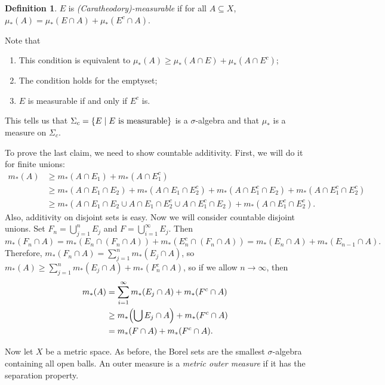 \documentclass[leqno, openany]{memoir}
\theoremstyle{definition}
\newtheorem{defn}[thm]{Definition}
\theoremstyle{remark}
\theoremstyle{plain}
\theoremstyle{definition}
\theoremstyle{remark}
\begin{document}
\begin{defn}
    $E$ is \textit{(Caratheodory)-measurable} if for all $A \subseteq X$, $\mu_*(A) = \mu_*(E \cap A) + \mu_*(E^c \cap A)$.
\end{defn}

Note that
\begin{enumerate}
    \item This condition is equivalent to $\mu_*(A) \geq \mu_*(A \cap E) + \mu_*(A \cap E^c)$;
    \item The condition holds for the emptyset;
    \item $E$ is measurable if and only if $E^c$ is.
\end{enumerate}
This tells us that $\Sigma_c = \qty{E \mid E \text{ is measurable}}$ is a $\sigma$-algebra and that $\mu_*$ is a measure on $\Sigma_c$.

To prove the last claim, we need to show countable additivity. First, we will do it for finite unions:
\begin{align*}
    m_*(A) &\geq m_*(A \cap E_1) + m_*(A \cap E_1^c) \\
           &\geq m_*(A \cap E_1 \cap E_2) + m_*(A \cap E_1 \cap E_2^c) + m_*(A \cap E_1^c \cap E_2) + m_*(A \cap E_1^c \cap E_2^c) \\
           &\geq m_*(A \cap E_1 \cap E_2 \cup A \cap E_1 \cap E_2^c \cup A \cap E_1^c \cap E_2) + m_*(A \cap E_1^c \cap E_2^c).
\end{align*}
Also, additivity on disjoint sets is easy. Now we will consider countable disjoint unions.
Set $F_n = \bigcup_{j=1}^n E_j$ and $F = \bigcup_{i=1}^{\infty} E_j$. Then
\[ m_*(F_n \cap A) = m_*(E_n \cap (F_n \cap A)) + m_*(E_n^c \cap (F_n \cap A)) = m_*(E_n \cap A) + m_*(E_{n-1} \cap A). \]
Therefore, $m_*(F_n \cap A) = \sum_{j=1}^n m_*(E_j \cap A)$, so $m_*(A) \geq \sum_{j=1}^n m_*(E_j \cap A) + m_*(F_n^c \cap A)$, so if we allow $n \to \infty$, then 
\begin{align*}
    m_*(A) &= \sum_{i=1}^{\infty} m_*(E_j \cap A) + m_*(F^c \cap A) \\
           &\geq m_*\qty(\bigcup E_j \cap A) + m_*(F^c \cap A) \\
           &= m_*(F \cap A) + m_*(F^c \cap A).
\end{align*}

Now let $X$ be a metric space. As before, the Borel sets are the smallest $\sigma$-algebra containing all open balls. An outer measure is a \textit{metric outer measure} if it has the separation property.
\end{document}
